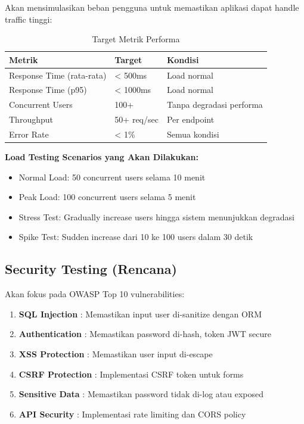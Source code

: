 Akan mensimulasikan beban pengguna untuk memastikan aplikasi dapat handle traffic tinggi:

\begin{table}[H]
\centering
\caption{Target Metrik Performa}
\label{tab:performance}
\begin{tabularx}{\textwidth}{|l|X|X|}
\hline
\textbf{Metrik} & \textbf{Target} & \textbf{Kondisi} \\
\hline
Response Time (rata-rata) & < 500ms & Load normal \\
\hline
Response Time (p95) & < 1000ms & Load normal \\
\hline
Concurrent Users & 100+ & Tanpa degradasi performa \\
\hline
Throughput & 50+ req/sec & Per endpoint \\
\hline
Error Rate & < 1\% & Semua kondisi \\
\hline
\end{tabularx}
\end{table}

\textbf{Load Testing Scenarios yang Akan Dilakukan:}
\begin{itemize}[leftmargin=*]
    \item Normal Load: 50 concurrent users selama 10 menit
    \item Peak Load: 100 concurrent users selama 5 menit
    \item Stress Test: Gradually increase users hingga sistem menunjukkan degradasi
    \item Spike Test: Sudden increase dari 10 ke 100 users dalam 30 detik
\end{itemize}

\subsection{Security Testing (Rencana)}

Akan fokus pada OWASP Top 10 vulnerabilities:

\begin{enumerate}[leftmargin=*]
    \item \textbf{SQL Injection} : Memastikan input user di-sanitize dengan ORM
    \item \textbf{Authentication} : Memastikan password di-hash, token JWT secure
    \item \textbf{XSS Protection} : Memastikan user input di-escape
    \item \textbf{CSRF Protection} : Implementasi CSRF token untuk forms
    \item \textbf{Sensitive Data} : Memastikan password tidak di-log atau exposed
    \item \textbf{API Security} : Implementasi rate limiting dan CORS policy
\end{enumerate}

